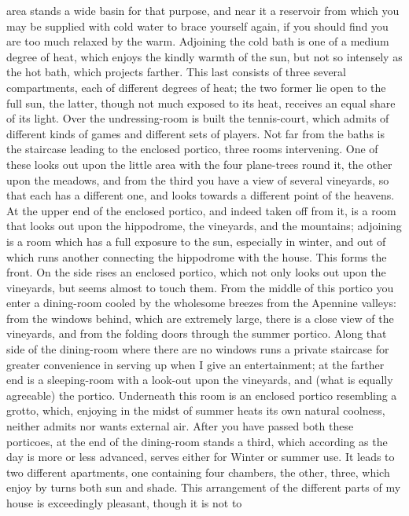 area stands a wide basin for that purpose, and near it a reservoir from
which you may be supplied with cold water to brace yourself again, if you
should find you are too much relaxed by the warm. Adjoining the cold bath
is one of a medium degree of heat, which enjoys the kindly warmth of the
sun, but not so intensely as the hot bath, which projects farther. This
last consists of three several compartments, each of different degrees of
heat; the two former lie open to the full sun, the latter, though not much
exposed to its heat, receives an equal share of its light. Over the
undressing-room is built the tennis-court, which admits of different kinds
of games and different sets of players. Not far from the baths is the
staircase leading to the enclosed portico, three rooms intervening. One of
these looks out upon the little area with the four plane-trees round it,
the other upon the meadows, and from the third you have a view of several
vineyards, so that each has a different one, and looks towards a different
point of the heavens. At the upper end of the enclosed portico, and indeed
taken off from it, is a room that looks out upon the hippodrome, the
vineyards, and the mountains; adjoining is a room which has a full
exposure to the sun, especially in winter, and out of which runs another
connecting the hippodrome with the house. This forms the front. On the
side rises an enclosed portico, which not only looks out upon the
vineyards, but seems almost to touch them. From the middle of this portico
you enter a dining-room cooled by the wholesome breezes from the Apennine
valleys: from the windows behind, which are extremely large, there is a
close view of the vineyards, and from the folding doors through the summer
portico. Along that side of the dining-room where there are no windows
runs a private staircase for greater convenience in serving up when I give
an entertainment; at the farther end is a sleeping-room with a look-out
upon the vineyards, and (what is equally agreeable) the portico.
Underneath this room is an enclosed portico resembling a grotto, which,
enjoying in the midst of summer heats its own natural coolness, neither
admits nor wants external air. After you have passed both these porticoes,
at the end of the dining-room stands a third, which according as the day
is more or less advanced, serves either for Winter or summer use. It leads
to two different apartments, one containing four chambers, the other,
three, which enjoy by turns both sun and shade. This arrangement of the
different parts of my house is exceedingly pleasant, though it is not to
